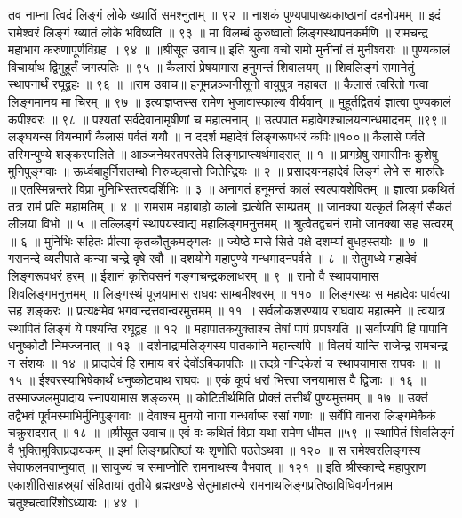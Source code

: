 तव नाम्ना त्विदं लिङ्गं लोके ख्यातिं समश्नुताम् ॥ ९२ ॥
नाशकं पुण्यपापाख्यकाष्ठानां दहनोपमम् ॥
इदं रामेश्वरं लिङ्गं ख्यातं लोके भविष्यति ॥ ९३ ॥
मा विलम्बं कुरुष्वातो लिङ्गस्थापनकर्मणि ॥
रामचन्द्र महाभाग करुणापूर्णविग्रह ॥ ९४ ॥
॥श्रीसूत उवाच॥
इति श्रुत्वा वचो रामो मुनीनां तं मुनीश्वराः ॥
पुण्यकालं विचार्याथ द्विमुहूर्तं जगत्पतिः ॥ ९५ ॥
कैलासं प्रेषयामास हनुमन्तं शिवालयम् ॥
शिवलिङ्गं समानेतुं स्थापनार्थं रघूद्वहः ॥ ९६ ॥
॥राम उवाच॥
हनूमन्नञ्जनीसूनो वायुपुत्र महाबल ॥
कैलासं त्वरितो गत्वा लिङ्गमानय मा चिरम् ॥ ९७ ॥
इत्याज्ञप्तस्स रामेण भुजावास्फाल्य वीर्यवान् ॥
मुहूर्तद्वितयं ज्ञात्वा पुण्यकालं कपीश्वरः ॥ ९८ ॥
पश्यतां सर्वदेवानामृषीणां च महात्मनाम् ॥
उत्पपात महावेगश्चालयन्गन्धमादनम् ॥९९॥
लङ्घयन्स वियन्मार्गं कैलासं पर्वतं ययौ ॥
न ददर्श महादेवं लिङ्गरूपधरं कपिः॥१००॥
कैलासे पर्वते तस्मिन्पुण्ये शङ्करपालिते ॥
आञ्जनेयस्तपस्तेपे लिङ्गप्राप्त्यर्थमादरात् ॥ १ ॥
प्रागग्रेषु समासीनः कुशेषु मुनिपुङ्गवाः ॥
ऊर्ध्वबाहुर्निरालम्बो निरुच्छ्वासो जितेन्द्रियः ॥ २ ॥
प्रसादयन्महादेवं लिङ्गं लेभे स मारुतिः ॥
एतस्मिन्नन्तरे विप्रा मुनिभिस्तत्त्वदर्शिभिः ॥ ३ ॥
अनागतं हनूमन्तं कालं स्वल्पावशेषितम् ॥
ज्ञात्वा प्रकथितं तत्र रामं प्रति महामतिम् ॥ ४ ॥
रामराम महाबाहो कालो ह्यत्येति साम्प्रतम् ॥
जानक्या यत्कृतं लिङ्गं सैकतं लीलया विभो ॥ ५ ॥
तल्लिङ्गं स्थापयस्वाद्य महालिङ्गमनुत्तमम् ॥
श्रुत्वैतद्वचनं रामो जानक्या सह सत्वरम् ॥ ६ ॥
मुनिभिः सहितः प्रीत्या कृतकौतुकमङ्गलः ॥
ज्येष्ठे मासे सिते पक्षे दशम्यां बुधहस्तयोः ॥ ७ ॥
गरानन्दे व्यतीपाते कन्या चन्द्रे वृषे रवौ ॥
दशयोगे महापुण्ये गन्धमादनपर्वते ॥ ८ ॥
सेतुमध्ये महादेवं लिङ्गरूपधरं हरम् ॥
ईशानं कृत्तिवसनं गङ्गाचन्द्रकलाधरम् ॥ ९ ॥
रामो वै स्थापयामास शिवलिङ्गमनुत्तमम् ॥
लिङ्गस्थं पूजयामास राघवः साम्बमीश्वरम् ॥ ११० ॥
लिङ्गस्थः स महादेवः पार्वत्या सह शङ्करः ॥
प्रत्यक्षमेव भगवान्दत्तवान्वरमुत्तमम् ॥ ११ ॥
सर्वलोकशरण्याय राघवाय महात्मने ॥
त्वयात्र स्थापितं लिङ्गं ये पश्यन्ति रघूद्वह ॥ १२ ॥
महापातकयुक्ताश्च तेषां पापं प्रणश्यति ॥
सर्वाण्यपि हि पापानि धनुष्कोटौ निमज्जनात् ॥ १३ ॥
दर्शनाद्रामलिङ्गस्य पातकानि महान्त्यपि ॥
विलयं यान्ति राजेन्द्र रामचन्द्र न संशयः ॥ १४ ॥
प्रादादेवं हि रामाय वरं देवोंऽबिकापतिः ॥
तदग्रे नन्दिकेशं च स्थापयामास राघवः ॥ ॥ १५ ॥
ईश्वरस्याभिषेकार्थं धनुष्कोट्याथ राघवः ॥
एकं कूपं धरां भित्त्वा जनयामास वै द्विजाः ॥ १६ ॥
तस्माज्जलमुपादाय स्नापयामास शङ्करम् ॥
कोटितीर्थमिति प्रोक्तं तत्तीर्थं पुण्यमुत्तमम् ॥ १७ ॥
उक्तं तद्वैभवं पूर्वमस्माभिर्मुनिपुङ्गवाः ॥
देवाश्च मुनयो नागा गन्धर्वाप्स रसां गणाः ॥
सर्वेपि वानरा लिङ्गमेकैकं चक्रुरादरात् ॥ १८ ॥
॥श्रीसूत उवाच॥
एवं वः कथितं विप्रा यथा रामेण धीमत ॥५९ ॥
स्थापितं शिवलिङ्गं वै भुक्तिमुक्तिप्रदायकम् ॥
इमां लिङ्गप्रतिष्ठां यः शृणोति पठतेऽथवा ॥ १२० ॥
स रामेश्वरलिङ्गस्य सेवाफलमवाप्नुयात् ॥
सायुज्यं च समाप्नोति रामनाथस्य वैभवात् ॥ १२१ ॥
इति श्रीस्कान्दे महापुराण एकाशीतिसाहस्र्यां संहितायां तृतीये ब्रह्मखण्डे सेतुमाहात्म्ये रामनाथलिङ्गप्रतिष्ठाविधिवर्णनन्नाम चतुश्चत्वारिंशोऽध्यायः ॥ ४४ ॥


